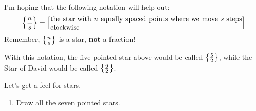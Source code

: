 \documentclass[noauthor,nooutcomes,hints,handout]{ximera}
\begin{document}
I'm hoping that the following notation will help out:
\[
\stringstar{n}{s}=\left[\begin{minipage}{3.7in}
the star with $n$ equally spaced points where we move $s$ steps clockwise
\end{minipage}\right]
\]
Remember, $\left\{\frac{n}{s}\right\}$ is a star, \textbf{not} a fraction!

With this notation, the five pointed star above would be called $\left\{\frac{5}{2}\right\}$, while the Star of David would be called $\left\{\frac{6}{2}\right\}$.



\begin{question}
Let's get a feel for stars. 
\begin{enumerate}
\item Draw all the seven pointed stars.
\begin{center}
\hspace{0.5in}
\hspace{0.5in}
\\[0.25in]
\hspace{0.5in}
\hspace{0.5in}
\end{center}


\end{enumerate}
\end{question}
\end{document}
